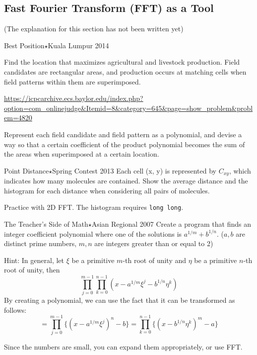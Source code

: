 \begin{versionbeta}
\section{Fast Fourier Transform (FFT) as a Tool}
(The explanation for this section has not been written yet)

\begin{pbox}{Best Position$\star$}{Kuala Lumpur 2014}
  
Find the location that maximizes agricultural and livestock production. Field candidates are rectangular areas, and production occurs at matching cells when field patterns within them are superimposed.

  \url{https://icpcarchive.ecs.baylor.edu/index.php?option=com_onlinejudge&Itemid=8&category=645&page=show_problem&problem=4820}
\end{pbox}

Represent each field candidate and field pattern as a polynomial, and devise a way so that a certain coefficient of the product polynomial becomes the sum of the areas when superimposed at a certain location.

\begin{pbox}{Point Distance$\star$}{Spring Contest 2013}
Each cell (x, y) is represented by $C_{xy}$, which indicates how many molecules are contained. Show the average distance and the histogram for each distance when considering all pairs of molecules.

\end{pbox}

Practice with 2D FFT. The histogram requires \texttt{long long}.

\begin{pbox}{The Teacher's Side of Math$\star$}{Asian Regional 2007}
Create a program that finds an integer coefficient polynomial where one of the solutions is $a^{1/m}+b^{1/n}$.
($a, b$ are distinct prime numbers, $m, n$ are integers greater than or equal to 2)

\end{pbox}

Hint:
In general, let $\xi$ be a primitive $m$-th root of unity and $\eta$ be a primitive $n$-th root of unity, then
$$
\prod_{j=0}^{m-1}\prod_{k=0}^{n-1}
(x-a^{1/m}\xi^j-b^{1/n}\eta^k)
$$
By creating a polynomial, we can use the fact that it can be transformed as follows:
$$
=\prod_{j=0}^{m-1}\{(x-a^{1/m}\xi^j)^n-b\}
=\prod_{k=0}^{n-1}\{(x-b^{1/n}\eta^k)^m-a\}
$$

Since the numbers are small, you can expand them appropriately, or use FFT.

\end{versionbeta}
